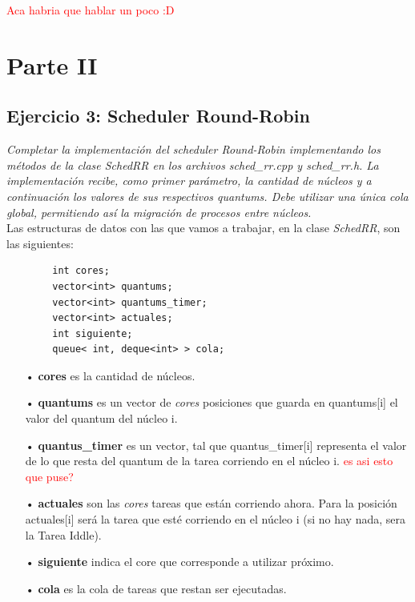 \documentclass[a4paper]{article}
\begin{document}
\textcolor{red}{Aca habria que hablar un poco :D}

\newpage
\section{Parte II}


\subsection{Ejercicio 3: Scheduler Round-Robin}

\textit{Completar la implementaci\'on del scheduler Round-Robin implementando los m\'etodos de la clase SchedRR en los archivos sched_rr.cpp y sched_rr.h. La implementaci\'on recibe, como primer par\'ametro, la cantidad de n\'ucleos y a continuaci\'on los valores de sus respectivos quantums. Debe utilizar una \'unica cola global, permitiendo as\'i la migraci\'on de procesos entre n\'ucleos.}\\


Las estructuras de datos con las que vamos a trabajar, en la clase \emph{SchedRR}, son las siguientes:
	\begin{codesnippet}
	\begin{verbatim}
		int cores;
		vector<int> quantums;
		vector<int> quantums_timer;
		vector<int> actuales;
		int siguiente;
		queue< int, deque<int> > cola;
	\end{verbatim}
	\end{codesnippet}
	
	\begin{itemize}
	\item[•]\textbf{cores} es la cantidad de n\'ucleos.
	\item[•]\textbf{quantums} es un vector de \textit{cores} posiciones que guarda en quantums[i] el valor del quantum del n\'ucleo i.
	\item[•]\textbf{quantus_timer} es un vector, tal que quantus_timer[i] representa el valor de lo que resta del quantum de la tarea corriendo en el n\'ucleo i. \textcolor{red}{es asi esto que puse?}
	\item[•]\textbf{actuales} son las \textit{cores} tareas que est\'an corriendo ahora. Para la posici\'on actuales[i] ser\'a la tarea que est\'e corriendo en el n\'ucleo i (si no hay nada, sera la Tarea Iddle).
	\item[•]\textbf{siguiente} indica el core que corresponde a utilizar pr\'oximo.
	\item[•]\textbf{cola} es la cola de tareas que restan ser ejecutadas.
	\end{itemize}	
	
\end{document}
